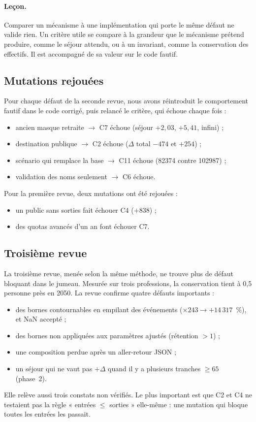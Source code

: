 \documentclass[11pt]{article}
\begin{document}
\paragraph{Leçon.} Comparer un mécanisme à une implémentation qui porte le même défaut ne valide
rien. Un critère utile se compare à la grandeur que le mécanisme prétend produire, comme le séjour
attendu, ou à un invariant, comme la conservation des effectifs. Il est accompagné de sa valeur sur
le code fautif.

\subsection{Mutations rejouées}
Pour chaque défaut de la seconde revue, nous avons réintroduit le comportement fautif dans le code
corrigé, puis relancé le critère, qui échoue chaque fois :
\begin{itemize}
  \item ancien masque retraite $\to$ C7 échoue (séjour $+2{,}03$\mesure{}, $+5{,}41$\mesure{},
        infini) ;
  \item destination publique $\to$ C2 échoue ($\Delta$ total $-474$\mesure{} et $+254$\mesure{}) ;
  \item scénario qui remplace la base $\to$ C11 échoue (\num{82374}\mesure{} contre
        \num{102987}\mesure{}) ;
  \item validation des noms seulement $\to$ C6 échoue.
\end{itemize}
Pour la première revue, deux mutations ont été rejouées :
\begin{itemize}
  \item un public sans sorties fait échouer C4 ($+838$\mesure{}) ;
  \item des quotas avancés d'un an font échouer C7.
\end{itemize}

\subsection{Troisième revue}
La troisième revue, menée selon la même méthode, ne trouve plus de défaut bloquant dans le jumeau.
Mesurée sur trois professions, la conservation tient à 0,5\mesure{} personne près en 2050. La revue
confirme quatre défauts importants :
\begin{itemize}
  \item des bornes contournables en empilant des événements ($\times243 \to +14\,317$\mesure{}~\%),
        et NaN accepté ;
  \item des bornes non appliquées aux paramètres ajustés (rétention $> 1$) ;
  \item une composition perdue après un aller-retour JSON ;
  \item un séjour qui ne vaut pas $+\Delta$ quand il y a plusieurs tranches $\ge 65$ (phase~2).
\end{itemize}
Elle relève aussi trois constats non vérifiés. Le plus important est que C2 et C4 ne testaient pas la
règle « entrées $\le$ sorties » elle-même : une mutation qui bloque toutes les entrées les passait.
\end{document}
